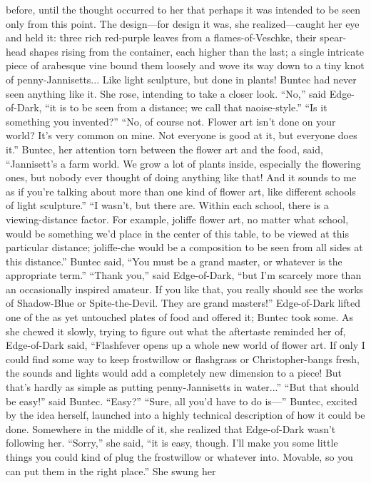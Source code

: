 \documentclass[9pt]{article}
\begin{document}
before, until the thought occurred to her that perhaps it was intended to be seen only from this point.
The design—for design it was, she realized—caught her eye and held it: three rich red-purple leaves
from a flames-of-Veschke, their spear-head shapes rising from the container, each higher than the last; a
single intricate piece of arabesque vine bound them loosely and wove its way down to a tiny knot of
penny-Jannisetts...
Like light sculpture, but done in plants! Buntec had never seen anything like it. She rose, intending to
take a closer look.
“No,” said Edge-of-Dark, “it is to be seen from a distance; we call that naoise-style.”
“Is it something you invented?”
“No, of course not. Flower art isn’t done on your world? It’s very common on mine. Not everyone
is good at it, but everyone does it.”
Buntec, her attention torn between the flower art and the food, said, “Jannisett’s a farm world. We
grow a lot of plants inside, especially the flowering ones, but nobody ever thought of doing anything like
that! And it sounds to me as if you’re talking about more than one kind of flower art, like different
schools of light sculpture.”
“I wasn’t, but there are. Within each school, there is a viewing-distance factor. For example, joliffe
flower art, no matter what school, would be something we’d place in the center of this table, to be
viewed at this particular distance; joliffe-che would be a composition to be seen from all sides at this
distance.”
Buntec said, “You must be a grand master, or whatever is the appropriate term.”
“Thank you,” said Edge-of-Dark, “but I’m scarcely more than an occasionally inspired amateur. If
you like that, you really should see the works of Shadow-Blue or Spite-the-Devil. They are grand
masters!”
Edge-of-Dark lifted one of the as yet untouched plates of food and offered it; Buntec took some. As
she chewed it slowly, trying to figure out what the aftertaste reminded her of, Edge-of-Dark said,
“Flashfever opens up a whole new world of flower art. If only I could find some way to keep frostwillow
or flashgrass or Christopher-bangs fresh, the sounds and lights would add a completely new dimension to
a piece! But that’s hardly as simple as putting penny-Jannisetts in water...”
“But that should be easy!” said Buntec.
“Easy?”
“Sure, all you’d have to do is—” Buntec, excited by the idea herself, launched into a highly technical
description of how it could be done. Somewhere in the middle of it, she realized that Edge-of-Dark
wasn’t following her. “Sorry,” she said, “it is easy, though. I’ll make you some little things you could kind
of plug the frostwillow or whatever into. Movable, so you can put them in the right place.” She swung her
\end{document}
